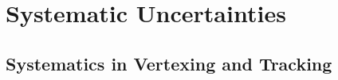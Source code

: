 \chapter{Systematic Uncertainties}
\label{chap:syst}

\section{Systematics in Vertexing and Tracking}
\label{sec:syst:vertexing}

